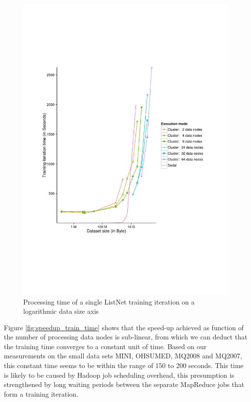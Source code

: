 \begin{figure}
\centering
\includegraphics[trim=0cm 5cm 0cm 5cm, scale=0.8]{gfx/time_single_logx.pdf}
\caption{Processing time of a single ListNet training iteration on a logarithmic data size axis}
\label{fig:listnet_train_time_log}
\end{figure}

Figure \ref{fig:speedup_train_time} shows that the speed-up achieved as function of the number of processing data nodes is sub-linear, from which we can deduct that the training time converges to a constant unit of time. Based on our measurements on the small data sets MINI, OHSUMED, MQ2008 and MQ2007, this constant time seems to be within the range of 150 to 200 seconds. This time is likely to be caused by Hadoop job scheduling overhead, this presumption is strengthened by long waiting periods between the separate MapReduce jobs that form a training iteration.\\

